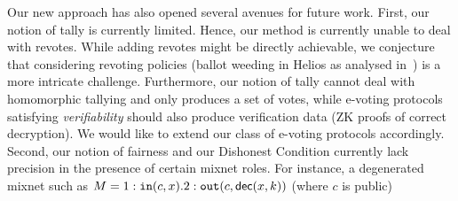 Our new approach has also opened
several avenues for future work.
First, our notion of tally is currently limited.
Hence, our method is currently unable to deal with revotes. While adding
revotes might be directly achievable,
we conjecture that considering revoting policies (\eg ballot weeding in Helios as analysed in~\cite{vote-ESO16})
is a more intricate challenge.
Furthermore, our notion of tally cannot deal with homomorphic tallying
and only produces a set of votes, while e-voting protocols satisfying {\em verifiability}
should also produce verification data (\eg ZK proofs of correct decryption). We would like to extend our class of e-voting protocols accordingly.
Second, our notion of fairness and our Dishonest Condition currently lack
precision in the presence of certain mixnet roles.
For instance, a degenerated mixnet such as 
$M=1:\mathtt{in}(c,x).2:\mathtt{out}(c,\mathsf{dec}(x,k))$ (where $c$ is public)
